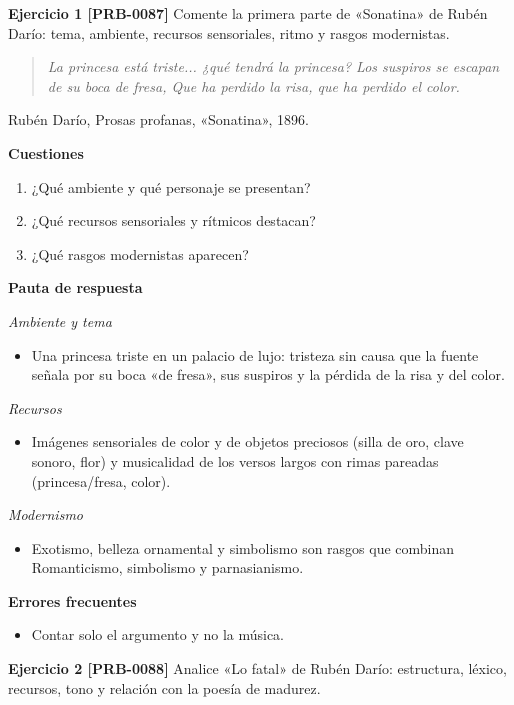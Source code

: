 \documentclass{book}
\begin{document}
\noindent\textbf{Ejercicio 1 [PRB-0087]}
Comente la primera parte de «Sonatina» de Rubén Darío: tema, ambiente, recursos sensoriales, ritmo y rasgos modernistas.


\begin{quote}
\itshape La princesa está triste... ¿qué tendrá la princesa? Los suspiros se escapan de su boca de fresa, Que ha perdido la risa, que ha perdido el color.
\end{quote}
{\noindent\footnotesize Rubén Darío, Prosas profanas, «Sonatina», 1896.\par}

\noindent\textbf{Cuestiones}
\begin{enumerate}
\item ¿Qué ambiente y qué personaje se presentan?
\item ¿Qué recursos sensoriales y rítmicos destacan?
\item ¿Qué rasgos modernistas aparecen?
\end{enumerate}

\noindent\textbf{Pauta de respuesta}

\noindent\textit{Ambiente y tema}
\begin{itemize}
\item Una princesa triste en un palacio de lujo: tristeza sin causa que la fuente señala por su boca «de fresa», sus suspiros y la pérdida de la risa y del color.
\end{itemize}

\noindent\textit{Recursos}
\begin{itemize}
\item Imágenes sensoriales de color y de objetos preciosos (silla de oro, clave sonoro, flor) y musicalidad de los versos largos con rimas pareadas (princesa/fresa, color).
\end{itemize}

\noindent\textit{Modernismo}
\begin{itemize}
\item Exotismo, belleza ornamental y simbolismo son rasgos que combinan Romanticismo, simbolismo y parnasianismo.
\end{itemize}

\noindent\textbf{Errores frecuentes}
\begin{itemize}
\item Contar solo el argumento y no la música.
\end{itemize}

\noindent\textbf{Ejercicio 2 [PRB-0088]}
Analice «Lo fatal» de Rubén Darío: estructura, léxico, recursos, tono y relación con la poesía de madurez.
\end{document}
